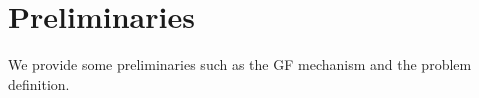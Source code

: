 \documentclass[a4paper,fleqn]{cas-sc}
\renewcommand{\cite}{\citep}
\begin{document}

\section{Preliminaries}
\label{section 3}

We provide some preliminaries such as the GF mechanism and the problem definition.
\end{document}
